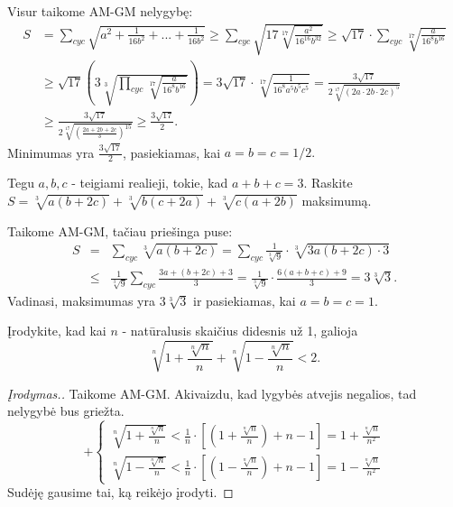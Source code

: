 \begin{sprendimas}Visur taikome AM-GM nelygybę:
  \begin{align*}
    S&=\sum_{cyc}{\sqrt{a^2+\frac{1}{16b^2}+...+\frac{1}{16b^2}}}
    \geq\sum_{cyc}{\sqrt{17\sqrt[17]{\frac{a^2}{16^{16}b^{32}}}}}
    \geq\sqrt{17}\cdot\sum_{cyc}{\sqrt[17]{\frac{a}{16^{8}b^{16}}}}\\
    &\geq\sqrt{17}\left(3\sqrt[3]{\prod_{cyc}{\sqrt[17]{\frac{a}{16^8b^{16}}}}}\right)=
    3\sqrt{17}\cdot\sqrt[17]{\frac{1}{16^8a^5b^5c^5}}=\frac{3\sqrt{17}}{2\sqrt[17]{\left(2a\cdot2b\cdot2c\right)^{5}}}\\
    &\geq \frac{3\sqrt{17}}{2\sqrt[17]{\left(\frac{2a+2b+2c}{3}\right)^{15}}}\geq \frac{3\sqrt{17}}{2}.
  \end{align*}
  Minimumas yra $\frac{3\sqrt{17}}{2}$, pasiekiamas, kai $a=b=c=1/2.$
\end{sprendimas}

\begin{pavnr}
  Tegu $a,b,c$ - teigiami realieji, tokie, kad $a+b+c=3$. Raskite
  $S=\sqrt[3]{a(b+2c)}+\sqrt[3]{b(c+2a)}+\sqrt[3]{c(a+2b)}$ maksimumą.
\end{pavnr}

\begin{sprendimas}
  Taikome AM-GM, tačiau priešinga puse:
  \begin{eqnarray*}S&=&\sum_{cyc}{\sqrt[3]{a(b+2c)}}=\sum_{cyc}{\frac{1}{\sqrt[3]{9}}\cdot\sqrt[3]{3a(b+2c)\cdot3}}\\
    &\leq&\frac{1}{\sqrt[3]{9}}\sum_{cyc}{\frac{3a+(b+2c)+3}{3}}=\frac{1}{\sqrt[3]{9}}\cdot\frac{6(a+b+c)+9}{3}=3\sqrt[3]{3}.
  \end{eqnarray*}
  Vadinasi, maksimumas yra $3\sqrt[3]{3}$ ir pasiekiamas, kai $a=b=c=1$.
\end{sprendimas}

\begin{pavnr}
  Įrodykite, kad kai $n$ - natūralusis skaičius didesnis už 1, galioja
  $$\sqrt[n]{1+\frac{\sqrt[n]{n}}{n}}+\sqrt[n]{1-\frac{\sqrt[n]{n}}{n}}<2.$$
\end{pavnr}

\begin{proof}[Įrodymas.] Taikome AM-GM. Akivaizdu, kad lygybės atvejis
  negalios, tad nelygybė bus griežta.
  $$+\left\{
  \begin{array}{ll}
    \sqrt[n]{1+\frac{\sqrt[n]{n}}{n}}<\frac{1}{n}\cdot\left[\left(1+\frac{\sqrt[n]{n}}{n}\right)+n-1\right]=1+\frac{\sqrt[n]{n}}{n^2}\\
    \sqrt[n]{1-\frac{\sqrt[n]{n}}{n}}<\frac{1}{n}\cdot\left[\left(1-\frac{\sqrt[n]{n}}{n}\right)+n-1\right]=1-\frac{\sqrt[n]{n}}{n^2}
  \end{array}
  \right.$$
  Sudėję gausime tai, ką reikėjo įrodyti.
\end{proof}

